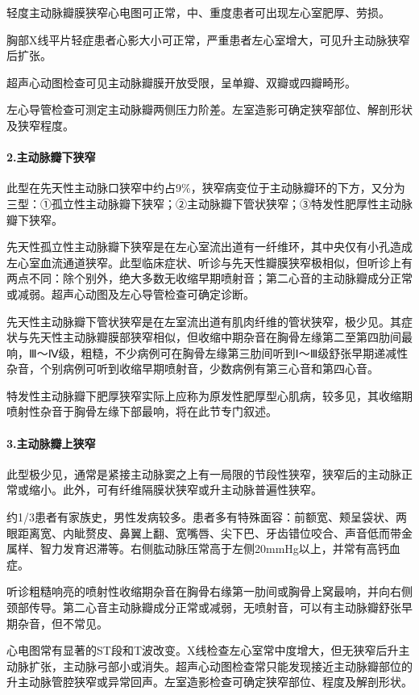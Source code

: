 轻度主动脉瓣膜狭窄心电图可正常，中、重度患者可出现左心室肥厚、劳损。

胸部X线平片轻症患者心影大小可正常，严重患者左心室增大，可见升主动脉狭窄后扩张。

超声心动图检查可见主动脉瓣膜开放受限，呈单瓣、双瓣或四瓣畸形。

左心导管检查可测定主动脉瓣两侧压力阶差。左室造影可确定狭窄部位、解剖形状及狭窄程度。

\paragraph{2.主动脉瓣下狭窄}

此型在先天性主动脉口狭窄中约占9\%，狭窄病变位于主动脉瓣环的下方，又分为三型：①孤立性主动脉瓣下狭窄；②主动脉瓣下管状狭窄；③特发性肥厚性主动脉瓣下狭窄。

先天性孤立性主动脉瓣下狭窄是在左心室流出道有一纤维环，其中央仅有小孔造成左心室血流通道狭窄。此型临床症状、听诊与先天性瓣膜狭窄极相似，但听诊上有两点不同：除个别外，绝大多数无收缩早期喷射音；第二心音的主动脉瓣成分正常或减弱。超声心动图及左心导管检查可确定诊断。

先天性主动脉瓣下管状狭窄是在左室流出道有肌肉纤维的管状狭窄，极少见。其症状与先天性主动脉瓣膜部狭窄相似，但收缩中期杂音在胸骨左缘第二至第四肋间最响，Ⅲ～Ⅳ级，粗糙，不少病例可在胸骨左缘第三肋间听到Ⅰ～Ⅲ级舒张早期递减性杂音，个别病例可听到收缩早期喷射音，少数病例有第三心音和第四心音。

特发性主动脉瓣下肥厚狭窄实际上应称为原发性肥厚型心肌病，较多见，其收缩期喷射性杂音于胸骨左缘下部最响，将在此节专门叙述。

\paragraph{3.主动脉瓣上狭窄}

此型极少见，通常是紧接主动脉窦之上有一局限的节段性狭窄，狭窄后的主动脉正常或缩小。此外，可有纤维隔膜状狭窄或升主动脉普遍性狭窄。

约1/3患者有家族史，男性发病较多。患者多有特殊面容：前额宽、颊呈袋状、两眼距离宽、内眦赘皮、鼻翼上翻、宽嘴唇、尖下巴、牙齿错位咬合、声音低而带金属样、智力发育迟滞等。右侧肱动脉压常高于左侧20mmHg以上，并常有高钙血症。

听诊粗糙响亮的喷射性收缩期杂音在胸骨右缘第一肋间或胸骨上窝最响，并向右侧颈部传导。第二心音主动脉瓣成分正常或减弱，无喷射音，可以有主动脉瓣舒张早期杂音，但不常见。

心电图常有显著的ST段和T波改变。X线检查左心室常中度增大，但无狭窄后升主动脉扩张，主动脉弓部小或消失。超声心动图检查常只能发现接近主动脉瓣部位的升主动脉管腔狭窄或异常回声。左室造影检查可确定狭窄部位、程度及解剖形状。

